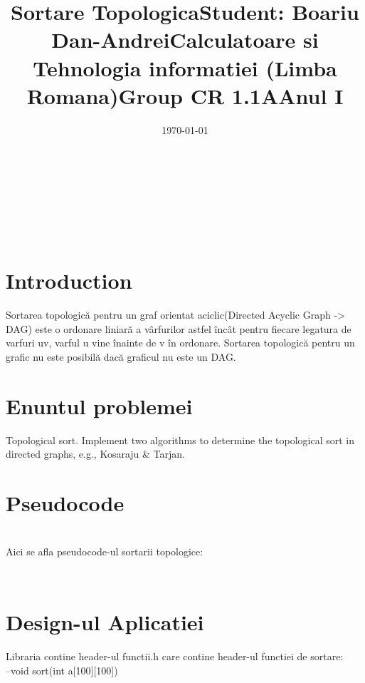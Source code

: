 ﻿\documentclass[14pt]{article}
\begin{document}
\title{\huge Sortare Topologica}
\date{\today}
\maketitle
\begin{center}
\vspace{30 mm}

\title{\huge Student: Boariu Dan-Andrei}
\\\vspace{10 mm}
\title{\huge Calculatoare si Tehnologia informatiei (Limba Romana)}
\\\vspace{10 mm}
\title{\huge Group CR 1.1A}
\\\vspace{10 mm}
\title{\huge Anul I}
\date{}
\maketitle

\newpage
\section*{Introduction}
\vspace{20 mm}
Sortarea topologică pentru un graf orientat aciclic(Directed Acyclic Graph -> DAG) este o ordonare liniară a vârfurilor astfel încât pentru fiecare legatura de varfuri uv, varful u vine înainte de v în ordonare. Sortarea topologică pentru un grafic nu este posibilă dacă graficul nu este un DAG.

\newpage
\end{center}
\section*{Enuntul problemei}
Topological sort. Implement two algorithms to determine the topological sort in
directed graphs, e.g., Kosaraju & Tarjan.




\newpage
\section*{Pseudocode} 
\\
Aici se afla pseudocode-ul  sortarii topologice:
\begin{lstlisting}
 

\end{lstlisting}

\newpage
\section*{Design-ul Aplicatiei}
\vspace{10 mm}
Libraria contine header-ul functii.h care contine header-ul functiei de sortare:
\\--void sort(int a[100][100])
\end{document}
